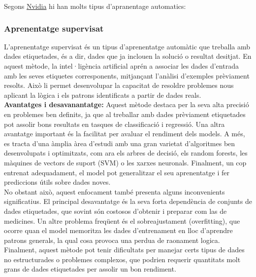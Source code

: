   Segons \href{https://blogs.nvidia.com/blog/supervised-unsupervised-learning/}{Nvidia} hi han molts tipus d'apranentage automatics:
  \begin{description}
   \item {}
   \item {}
   \item {}
   \item {}
  \end{description}
\subsubsection{Aprenentatge supervisat}\label{subsubsec:Aprenentatge supervisat}
L'aprenentatge supervisat és un tipus d'aprenentatge automàtic que treballa amb dades etiquetades, és a dir, dades que ja inclouen la solució o resultat desitjat. En aquest mètode, la intel·ligència artificial aprén a associar les dades d'entrada amb les seves etiquetes corresponents, mitjançant l'anàlisi d'exemples prèviament resolts. Això li permet desenvolupar la capacitat de resoldre problemes nous aplicant la lògica i els patrons identificats a partir de dades reals. \\

\textbf{Avantatges i desavanantatge:}
Aquest mètode destaca per la seva alta precisió en problemes ben definits, ja que al treballar amb dades prèviament etiquetades pot assolir bons resultats en tasques de classificació i regressió. Una altra avantatge important és la facilitat per avaluar el rendiment dels models. A més, es tracta d'una àmplia àrea d'estudi amb una gran varietat d'algoritmes ben desenvolupats i optimitzats, com ara els arbres de decisió, els random forests, les màquines de vectors de suport (SVM) o les xarxes neuronals. Finalment, un cop entrenat adequadament, el model pot generalitzar el seu aprenentatge i fer prediccions útils sobre dades noves.\\

No obstant això, aquest enfocament també presenta alguns inconvenients significatius. El principal desavantatge és la seva forta dependència de conjunts de dades etiquetades, que sovint són costosos d'obtenir i preparar com las de medicines. Un altre problema freqüent és el sobreajustament (overfitting), que ocorre quan el model memoritza les dades d'entrenament en lloc d'aprendre patrons generals, la qual cosa provoca una perdua de raonament logica. Finalment, aquest mètode pot tenir dificultats per manejar certs tipus de dades no estructurades o problemes complexos, que podrien requerir quantitats molt grans de dades etiquetades per assolir un bon rendiment.


